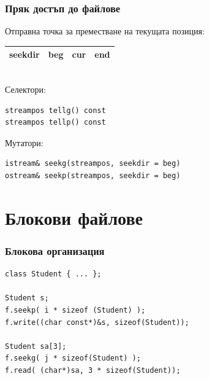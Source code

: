 \documentclass{beamer}
\begin{document}
\begin{frame}[fragile]
  \frametitle{Пряк достъп до файлове}

  Отправна точка за преместване на текущата позиция:\\
  \begin{tabular}{|c||c|c|c|}
    \hline
    seekdir&beg&cur&end\\
    \hline
  \end{tabular}\\[2em]
  Селектори:
\begin{lstlisting}
streampos tellg() const
streampos tellp() const
\end{lstlisting}
  Мутатори:
\begin{lstlisting}
istream& seekg(streampos, seekdir = beg)
ostream& seekp(streampos, seekdir = beg)
\end{lstlisting}
\end{frame}

\section{Блокови файлове}

\begin{frame}[fragile]
  \frametitle{Блокова организация}

  \begin{center}
    \newcommand{\yc}{|[fill=yellow]|}
    \makecommand{\gc}{|[fill=green]|}
    \newcommand{\byc}{\yc\&\yc\&\yc\&\yc}
    \newcommand{\bgc}{\gc\&\gc\&\gc\&\gc}
  \end{center}
\begin{lstlisting}
class Student { ... };

Student s;
f.seekp( i * sizeof (Student) );
f.write((char const*)&s, sizeof(Student));

Student sa[3];
f.seekg( j * sizeof(Student) );
f.read( (char*)sa, 3 * sizeof(Student));
\end{lstlisting}
\end{frame}
\end{document}
